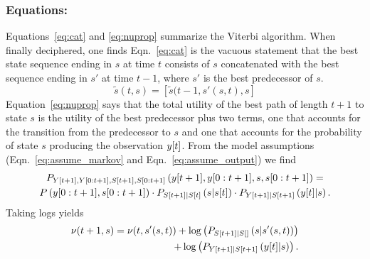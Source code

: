 \subsubsection*{Equations:}
Equations~\eqref{eq:cat} and \eqref{eq:nuprop} summarize the Viterbi
algorithm.  When finally deciphered, one finds Eqn.~\eqref{eq:cat} is
the vacuous statement that the best state sequence ending in $s$ at
time $t$ consists of $s$ concatenated with the best sequence ending
in $s'$ at time $t-1$, where $s'$ is the best predecessor of $s$.
\begin{equation}
  \label{eq:cat}
  \tilde s(t,s) = \left[ \tilde s(t-1,s'(s,t),s \right]
\end{equation}
Equation~\eqref{eq:nuprop} says that the total utility of the best
path of length $t+1$ to state $s$ is the utility of the best
predecessor plus two terms, one that accounts for the transition from
the predecessor to $s$ and one that accounts for the probability of
state $s$ producing the observation ${y}{[t]}$.  From the model
assumptions (Eqn.~\eqref{eq:assume_markov} and
Eqn.~\eqref{eq:assume_output}) we find
\begin{multline*}
  P_{{Y}{[t+1]},Y[0:t+1],{S}{[t+1]},S[0:t+1]}
  \left({y}{[t+1]},y[0:t+1],s,s[0:t+1] \right) =\\
  P\left(y[0:t+1], s[0:t+1] \right) \cdot
  P_{{S}{[t+1]}|{S}{[t]}} \left(s|{s}{[t]} \right) \cdot
  P_{{Y}{[t+1]}|{S}{[t+1]}} \left({y}{[t]}|s \right).
\end{multline*}
Taking logs yields
\begin{equation}
  \label{eq:nuprop}
  \begin{split}
    \nu (t+1,s) = \nu(t,s'(s,t)) +
    \log\left(P_{{S}{[t+1]}|{S}{[]}} \left(s|s'(s,t) \right)\right)\\
    \quad + \log \left( P_{{Y}{[t+1]}|{S}{[t+1]}}
      \left({y}{[t]}|s\right)\right).
  \end{split}
\end{equation}

